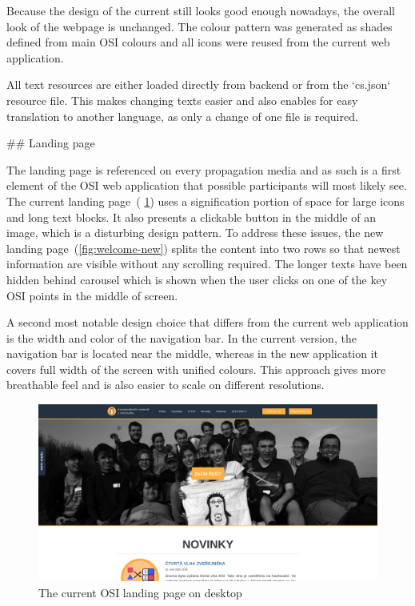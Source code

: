 \documentclass[
  digital, %
  oneside, %
  lof,     %
  lot,     %
]{fithesis4}
\begin{document}
{Because the design of the current still looks good enough nowadays, the overall look of the webpage is unchanged. The colour pattern was generated as shades defined from main OSI colours and all icons were reused from the current web application.

All text resources are either loaded directly from backend or from the `cs.json` resource file. This makes changing texts easier and also enables for easy translation to another language, as only a change of one file is required.

## Landing page

The landing page is referenced on every propagation media and as such is a first element of the OSI web application that possible participants will most likely see. The current landing page~( \ref{fig:welcome-curr}) uses a signification portion of space for large icons and long text blocks. It also presents a clickable button in the middle of an image, which is a disturbing design pattern. To address these issues, the new landing page~(\ref{fig:welcome-new}) splits the content into two rows so that newest information are visible without any scrolling required. The longer texts have been hidden behind carousel which is shown when the user clicks on one of the key OSI points in the middle of screen.

A second most notable design choice that differs from the current web application is the width and color of the navigation bar. In the current version, the navigation bar is located near the middle, whereas in the new application it covers full width of the screen with unified colours. This approach gives more breathable feel and is also easier to scale on different resolutions.

\begin{figure}
\includegraphics[width=\textwidth]{assets/img/welcome_curr}
\caption{The current OSI landing page on desktop}
\label{fig:welcome-curr}
\end{figure}

}
\end{document}
